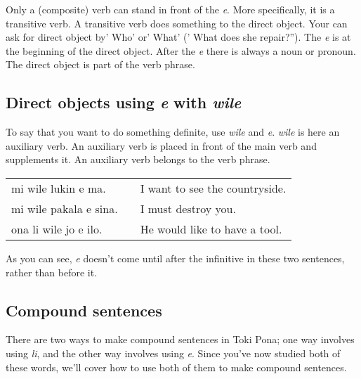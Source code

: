 Only a (composite) verb can stand in front of the \textit{e}. 
More specifically, it is a transitive verb. 
A transitive verb does something to the direct object. 
Your can ask for direct object by' Who' or' What' (' What does she repair?'').
The \textit{e} is at the beginning of the direct object. 
After the \textit{e} there is always a noun or pronoun. 
The direct object is part of the verb phrase. 
%
{}
\subsection*{Direct objects using \textit{e} with \textit{wile}}
%
To say that you want to do something definite, use \textit{wile} and \textit{e}.
\textit{wile} is here an auxiliary verb. 
An auxiliary verb is placed in front of the main verb and supplements it. 
An auxiliary verb belongs to the verb phrase. 

\begin{supertabular}{p{5,5cm}|ll}
mi wile lukin e ma. && I want to see the countryside. \\
mi wile pakala e sina. && I must destroy you. \\
ona li wile jo e ilo. && He would like to have a tool. \\
\end{supertabular} 

As you can see, \textit{e} doesn't come until after the infinitive in these two sentences, rather than before it. 

\newpage
{}
\label{'multiple_li'}
\subsection*{Compound sentences}
%
There are two ways to make compound sentences in Toki Pona; one way involves using \textit{li}, and the other way involves using \textit{e}. 
Since you've now studied both of these words, we'll cover how to use both of them to make compound sentences. 

